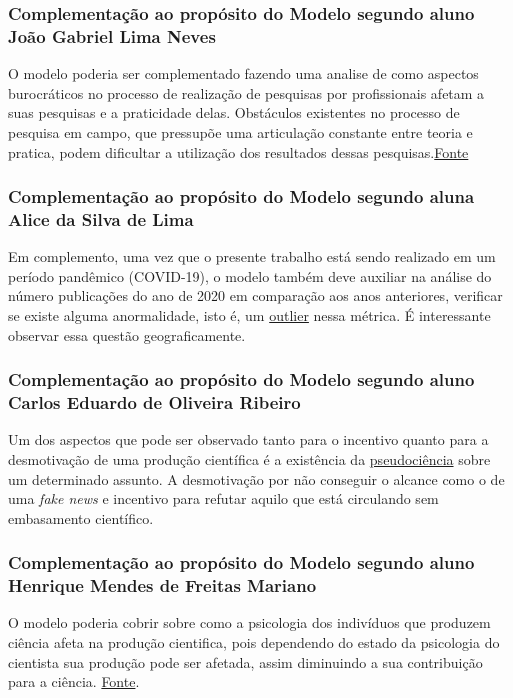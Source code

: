 \subsubsection{Complementação ao propósito do Modelo segundo aluno João Gabriel Lima Neves}

O modelo poderia ser complementado fazendo uma analise de como aspectos burocráticos no processo de realização de pesquisas por profissionais afetam a suas pesquisas e a praticidade delas. Obstáculos existentes no processo de pesquisa em campo, que pressupõe uma articulação constante entre teoria e pratica, podem dificultar a utilização dos resultados dessas pesquisas.\href{https://www.scielo.br/j/icse/a/pZ8djC8vGSWbkQzwmKr4ByH/?lang=pt}{Fonte} 



\subsubsection{Complementação ao propósito do Modelo segundo aluna Alice da Silva de Lima}
Em complemento, uma vez que o presente trabalho está sendo realizado em um período pandêmico (COVID-19), o modelo também deve auxiliar na análise do número publicações do ano de 2020 em comparação aos anos anteriores, verificar se existe alguma anormalidade, isto é, um \href{https://medium.com/ensina-ai/outlier-o-ponto-fora-da-curva-1f28f3d9c23}{outlier} nessa métrica. É interessante observar essa questão geograficamente.

\subsubsection{Complementação ao propósito do Modelo segundo aluno Carlos Eduardo de Oliveira Ribeiro}
Um dos aspectos que pode ser observado tanto para o incentivo quanto para a desmotivação de uma produção científica é a existência da \href{https://pt.wikipedia.org/wiki/Pseudoci\%C3\%AAncia}{pseudociência} sobre um determinado assunto. A desmotivação por não conseguir o alcance como o de uma \textit{fake news} e incentivo para refutar aquilo que está circulando sem embasamento científico.

\subsubsection{Complementação ao propósito do Modelo segundo aluno Henrique Mendes de Freitas Mariano}
O modelo poderia cobrir sobre como a psicologia dos indivíduos que produzem ciência afeta na produção cientifica, pois dependendo do estado da psicologia do cientista sua produção pode ser afetada, assim diminuindo a sua contribuição para a ciência. \href{https://www.scielo.br/j/psoc/a/6X46nvFMKpmcLKv7HnYx76R/?lang=pt}{Fonte}.



